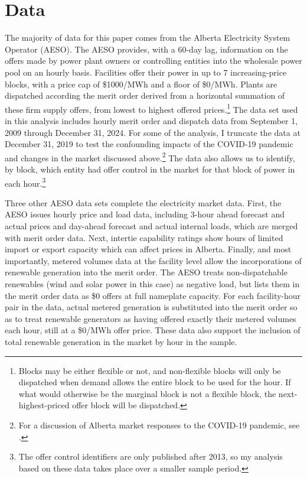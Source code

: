 \documentclass[12pt]{article}
\begin{document}
\section{Data}\label{sec:data}

The majority of data for this paper comes from the Alberta Electricity System Operator (AESO). The AESO provides, with a 60-day lag, information on the offers made by power plant owners or controlling entities into the wholesale power pool on an hourly basis. Facilities offer their power in up to 7 increasing-price blocks, with a price cap of \$1000/MWh and a floor of \$0/MWh. Plants are dispatched according the merit order derived from a horizontal summation of these firm supply offers, from lowest to highest offered prices.\footnote{Blocks may be either flexible or not, and non-flexible blocks will only be dispatched when demand allows the entire block to be used for the hour. If what would otherwise be the marginal block is not a flexible block, the next-highest-priced offer block will be dispatched.} The data set used in this analysis includes hourly merit order and dispatch data from September 1, 2009 through December 31, 2024. For some of the analysis, I truncate the data at December 31, 2019 to test the confounding impacts of the COVID-19 pandemic and changes in the market discussed above.\footnote{For a discussion of Alberta market responses to the COVID-19 pandemic, see \cite{leach_rivers_shaffer}.} The data also allows us to identify, by block, which entity had offer control in the market for that block of power in each hour.\footnote{The offer control identifiers are only published after 2013, so my analysis based on these data takes place over a smaller sample period.}

Three other AESO data sets complete the electricity market data. First, the AESO issues hourly price and load data, including 3-hour ahead forecast and actual prices and day-ahead forecast and actual internal loads, which are merged with merit order data. Next, intertie capability ratings show hours of limited import or export capacity which can affect prices in Alberta. Finally, and most importantly, metered volumes data at the facility level allow the incorporations of renewable generation into the merit order. The AESO treats non-dispatchable renewables (wind and solar power in this case) as negative load, but lists them in the merit order data as \$0 offers at full nameplate capacity. For each facility-hour pair in the data, actual metered generation is substituted into the merit order so as to treat renewable generators as having offered exactly their metered volumes each hour, still at a \$0/MWh offer price. These data also support the inclusion of total renewable generation in the market by hour in the sample.
\end{document}
